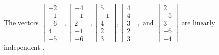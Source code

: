 \begin{exercise}
\begin{exerciseStatement}
  \end{exerciseStatement}
  \begin{exerciseAnswer}
   The vectors \(\left[\begin{array}{r}
-2 \\
-1 \\
-6 \\
4 \\
-5
\end{array}\right] , \left[\begin{array}{r}
-4 \\
-1 \\
2 \\
-1 \\
-6
\end{array}\right] , \left[\begin{array}{r}
5 \\
-1 \\
4 \\
2 \\
3
\end{array}\right] , \left[\begin{array}{r}
4 \\
4 \\
3 \\
2 \\
3
\end{array}\right] , \text{ and } \left[\begin{array}{r}
2 \\
-5 \\
3 \\
-6 \\
-4
\end{array}\right]\) are 
  	 linearly independent  .
  


  \end{exerciseAnswer}
\end{exercise}